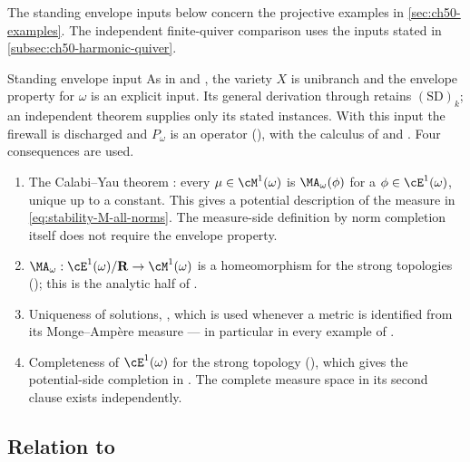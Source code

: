 The standing envelope inputs below concern the projective examples
in \cref{sec:ch50-examples}. The independent finite-quiver comparison
uses the inputs stated in \cref{subsec:ch50-harmonic-quiver}.

\begin{important}{Standing envelope input}
\label{imp:ch50-envelope}
As in 
and , the variety $X$ is unibranch and
the envelope property for $\omega$ is an explicit input. Its general
derivation through  retains $\mathrm{(SD)}_k$;
an independent theorem supplies only its stated instances. With this input
the firewall  is discharged and $P_\omega$ is
an operator (), with the calculus of
 and
.  Four consequences are used.
\begin{enumerate}
\item\label{itm:ch50-env:cy}
      The Calabi--Yau theorem : every
      $\mu\in\cM^1(\omega)$ is $\MA_\omega(\phi)$ for a
      $\phi\in\cE^1(\omega)$, unique up to a constant.  This gives a
      potential description of the measure in
      \eqref{eq:stability-M-all-norms}.  The measure-side definition by
      norm completion itself does not require the envelope property.
\item\label{itm:ch50-env:homeo}
      $\MA_\omega:\cE^1(\omega)/\mathbf R\to\cM^1(\omega)$ is a
      homeomorphism for the strong topologies
      (); this is the analytic half of
      .
\item\label{itm:ch50-env:uniqueness}
      Uniqueness of solutions, , which is used
      whenever a metric is identified from its Monge--Amp\`ere measure ---
      in particular in every example of .
\item\label{itm:ch50-env:completeness}
      Completeness of $\cE^1(\omega)$ for the strong topology
      (), which gives the potential-side
      completion in .  The complete
      measure space in its second clause exists independently.
\end{enumerate}
\end{important}

\subsection{Relation to \texorpdfstring{}{Part III}}
\label{sec:ch50-part3}

